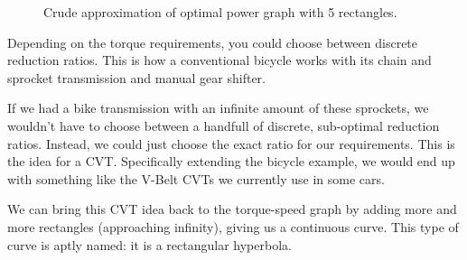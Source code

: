 \documentclass[12pt]{article}
\begin{document}
\begin{figure}[H]
  \caption{Crude approximation of optimal power graph with 5 rectangles.}\label{fig:layered_rects}
\end{figure}

Depending on the torque requirements, you could choose between discrete reduction ratios. This is how a conventional bicycle works with its chain and sprocket transmission and manual gear shifter.

If we had a bike transmission with an infinite amount of these sprockets, we wouldn't have to choose between a handfull of discrete, sub-optimal reduction ratios. Instead, we could just choose the exact ratio for our requirements. This is the idea for a CVT. Specifically extending the bicycle example, we would end up with something like the V-Belt CVTs we currently use in some cars. 

We can bring this CVT idea back to the torque-speed graph by adding more and more rectangles (approaching infinity), giving us a continuous curve. This type of curve is aptly named: it is a rectangular hyperbola.
\end{document}
